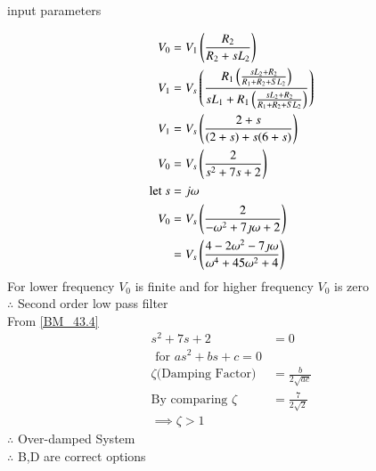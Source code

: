 \documentclass[journal,12pt,onecolumn]{IEEEtran}
\theoremstyle{remark}
\begin{document}
 \begin{table}[!ht]
    \centering
        
    \caption{input parameters}
\end{table}
\begin{align}
    V_0&=V_1\left(\frac{R_2}{R_2+sL_2}\right)\\
   V_1&=V_s\left(\frac{R_1\left(\frac{sL_2+R_2}{R_1+R_2+SL_2}\right)}{sL_1+R_1\left(\frac{sL_2+R_2}{R_1+R_2+SL_2}\right)}\right)\\
   V_1&=V_s\left(\frac{2+s}{(2+s)+s(6+s)}\right)\\
   V_0&=V_s\left(\frac{2}{s^2+7s+2}\right)\\ \label{BM_43.4}
   \text{let } s&=j\omega\\
   V_0&= V_s\left(\frac{2}{-\omega^2 + 7\jmath\omega+2}\right)\\
   &=V_s\left(\frac{4-2\omega^2-7\jmath\omega}{\omega^4+45\omega^2+4}\right)
\end{align}
For lower frequency $V_0$ is finite and for higher frequency $V_0$ is zero\\
 $\therefore $  Second order low pass filter\\
 From \ref{BM_43.4}
\begin{align}
    s^2+7s+2&=0\\
    \text{ for } as^2+bs+c=0\\
\zeta\text{(Damping Factor)}&=\frac{b}{2\sqrt{ac}}\\
\text{By comparing }\zeta&=\frac{7}{2\sqrt{2}}\\
\implies \zeta>1
\end{align}
$\therefore $  Over-damped System\\
$\therefore$ B,D are correct options
\end{document}
